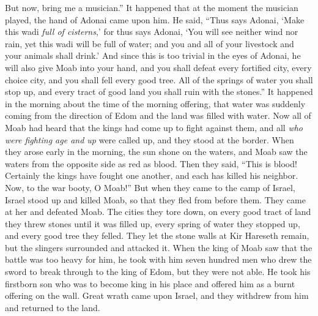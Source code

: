\begin{biblechapter}
\verse But now, bring me a musician.” It happened that at the moment the musician played, the hand of Adonai came upon him.
\verse He said, “Thus says Adonai, ‘Make this wadi \textit{full of cisterns},’
\verse for thus says Adonai, ‘You will see neither wind nor rain, yet this wadi will be full of water; and you and all of your livestock and your animals shall drink.’
\verse And since this is too trivial in the eyes of Adonai, he will also give Moab into your hand,
\verse and you shall defeat every fortified city, every choice city, and you shall fell every good tree. All of the springs of water you shall stop up, and every tract of good land you shall ruin with the stones.”
\verse It happened in the morning about the time of the morning offering, that water was suddenly coming from the direction of Edom and the land was filled with water.
\verse Now all of Moab had heard that the kings had come up to fight against them, and all \textit{who were fighting age and up} were called up, and they stood at the border.
\verse When they arose early in the morning, the sun shone on the waters, and Moab saw the waters from the opposite side as red as blood.
\verse Then they said, “This is blood! Certainly the kings have fought one another, and each has killed his neighbor. Now, to the war booty, O Moab!”
\verse But when they came to the camp of Israel, Israel stood up and killed Moab, so that they fled from before them. They came at her and defeated Moab.
\verse The cities they tore down, on every good tract of land they threw stones until it was filled up, every spring of water they stopped up, and every good tree they felled. They let the stone walls at Kir Hareseth remain, but the slingers surrounded and attacked it.
\verse When the king of Moab saw that the battle was too heavy for him, he took with him seven hundred men who drew the sword to break through to the king of Edom, but they were not able.
\verse He took his firstborn son who was to become king in his place and offered him as a burnt offering on the wall. Great wrath came upon Israel, and they withdrew from him and returned to the land.
\end{biblechapter}

